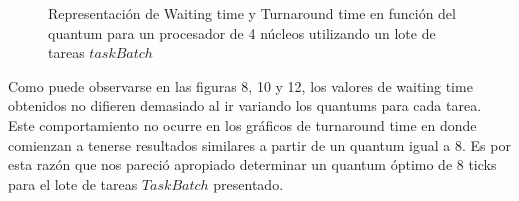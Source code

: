\begin{figure}[H]
\hfill
{}
\hfill
{}
\hfill
\caption{Representación de Waiting time y Turnaround time en función del quantum para un procesador de 4 núcleos utilizando un lote de tareas $taskBatch$}
\end{figure}

Como puede observarse en las figuras 8, 10 y 12, los valores de waiting time obtenidos no difieren demasiado al ir variando los quantums para cada tarea. Este comportamiento no ocurre en los gráficos de turnaround time en donde comienzan a tenerse resultados similares a partir de un quantum igual a 8. Es por esta razón que nos pareció apropiado determinar un quantum óptimo de 8 ticks para el lote de tareas $TaskBatch$ presentado.

